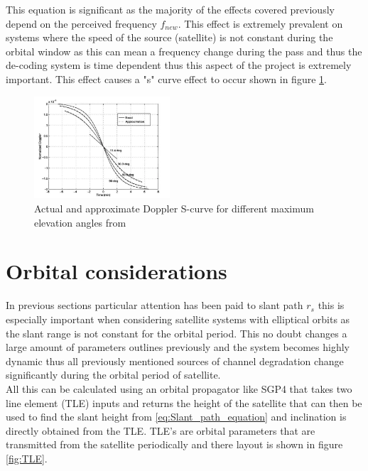 \documentclass[conference]{IEEEtran}
\begin{document}
This equation is significant as the majority of the effects covered previously depend on the perceived frequency $f_{new}$. This effect is extremely prevalent on systems where the speed of the source (satellite) is not constant during the orbital window as this can mean a frequency change during the pass and thus the de-coding system is time dependent thus this aspect of the project is extremely important. This effect causes a "s" curve effect to occur shown in figure \ref{fig:Doppler}.

\begin{figure}[h]
\centering
	\includegraphics[width = 0.45\textwidth]{Doppler_s_curve.png}
	\caption{Actual and approximate Doppler S-curve for different maximum elevation angles from \cite{doppler_effect}}
	\label{fig:Doppler}
\end{figure}

\label{sec:Doppler}

\section{Orbital considerations}
In previous sections particular attention has been paid to slant path $r_s$ this is especially important when considering satellite systems with elliptical orbits as the slant range is not constant for the orbital period. This no doubt changes a large amount of parameters outlines previously and the system becomes highly dynamic thus all previously mentioned sources of channel degradation change significantly during the orbital period of satellite.\\

All this can be calculated using an orbital propagator like SGP4 that takes two line element (TLE) inputs and returns the height of the satellite that can then be used to find the slant height from \ref{eq:Slant_path_equation} and inclination is directly obtained from the TLE. TLE's are orbital parameters that are transmitted from the satellite periodically and there layout is shown in figure \ref{fig:TLE}.
\end{document}
